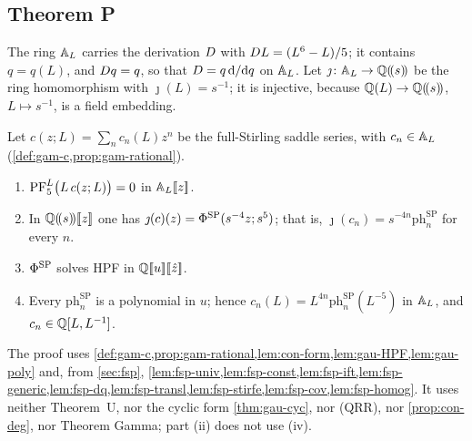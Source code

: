 \subsection{Theorem P}
\label{sec:con-P}

The ring $\mathbb{A}_{L}$ carries the derivation $D$ with $D L=(L^6-L)/5$; it contains $q=q(L)$, and $D q=q$, so that $D=q\,\mathrm{d}/\mathrm{d} q$ on $\mathbb{A}_{L}$. Let $\jmath\colon\mathbb{A}_{L}\to\mathbb{Q}(\!(s)\!)$ be the ring homomorphism with $\jmath(L)=s^{-1}$; it is injective, because $\mathbb{Q}(L)\to\mathbb{Q}(\!(s)\!)$, $L\mapsto s^{-1}$, is a field embedding.

\begin{thm}[Theorem P(a)]
\label{thm:con-Pa}
Let $c(z;L)=\sum_nc_n(L)z^n$ be the full-Stirling saddle series, with $c_n\in\mathbb{A}_{L}$ (\cref{def:gam-c,prop:gam-rational}).
\begin{enumerate}
\item $\mathrm{PF}_{5}^{L}\bigl(L\,c(z;L)\bigr)=0$ in $\mathbb{A}_{L}[\![ z ]\!]$.
\item In $\mathbb{Q}(\!(s)\!)[\![ z ]\!]$ one has $\jmath(c)(z)=\Phi^{\mathrm{SP}}(s^{-4}z;s^5)$; that is, $\jmath(c_n)=s^{-4n}\mathrm{ph}^{\mathrm{SP}}_n$ for every $n$.
\item $\Phi^{\mathrm{SP}}$ solves HPF in $\mathbb{Q}[\![ u ]\!][\![ \hat{z} ]\!]$.
\item Every $\mathrm{ph}^{\mathrm{SP}}_n$ is a polynomial in $u$; hence $c_n(L)=L^{4n}\mathrm{ph}^{\mathrm{SP}}_n(L^{-5})$ in $\mathbb{A}_{L}$, and $c_n\in\mathbb{Q}[L,L^{-1}]$.
\end{enumerate}
\end{thm}

The proof uses \cref{def:gam-c,prop:gam-rational,lem:con-form,lem:gau-HPF,lem:gau-poly} and, from \cref{sec:fsp}, \cref{lem:fsp-univ,lem:fsp-const,lem:fsp-ift,lem:fsp-generic,lem:fsp-dq,lem:fsp-transl,lem:fsp-stirfe,lem:fsp-cov,lem:fsp-homog}. It uses neither Theorem~U, nor the cyclic form \cref{thm:gau-cyc}, nor (QRR), nor \cref{prop:con-deg}, nor Theorem Gamma; part (ii) does not use (iv).


